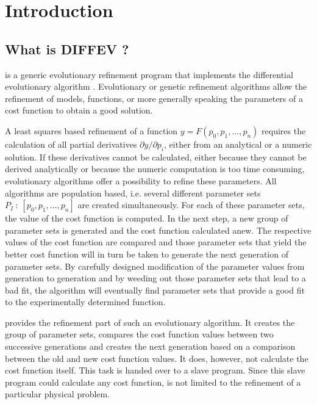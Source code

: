 
\chapter{Introduction \label{intro}}
\section{What is DIFFEV ?}

\diffev is a generic evolutionary refinement program that implements the
differential evolutionary algorithm \cite{prstla2005}. Evolutionary or
genetic refinement algorithms allow the refinement of models, functions,
or more generally speaking the parameters of a cost function to obtain
a good solution. 

A least squares based refinement of a function 
$y = F(p_{0}, p_{1}, ..., p_{n})$ requires the calculation of all
partial derivatives $\partial y/ \partial p_{i}$, either from an 
analytical or a numeric solution. If these derivatives cannot be 
calculated, either because they cannot be derived analytically
or because the numeric computation is too time consuming, evolutionary
algorithms offer a possibility to refine these parameters. All
algorithms are population based, i.e. several different parameter sets
$P_I ~:~ [p_{0}, p_{1}, ..., p_{n}]$ are created simultaneously. For 
each of these parameter sets, the value of the cost function is 
computed. In the next step, a new group of parameter sets is
generated and the cost function calculated anew. The respective
values of the cost function are compared and those parameter sets
that yield the better cost function will in turn be taken to generate
the next generation of parameter sets. By carefully designed modification
of the parameter values from generation to generation and by weeding 
out those parameter sets that lead to a bad fit, the algorithm will
eventually find parameter sets that provide a good fit to the 
experimentally determined function. 

\Diffev provides the refinement part of such an evolutionary 
algorithm. It creates the group of parameter sets, compares the
cost function values between two successive generations and creates
the next generation based on a comparison between the old and new
cost function values. It does, however, not calculate the cost
function itself. This task is handed over to a slave program.
Since this slave program could calculate any cost function, 
\Diffev is not limited to the refinement of a particular physical
problem. 

